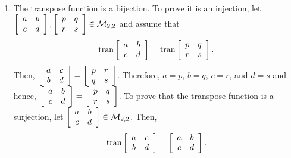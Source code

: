 \begin{enumerate}
\begin{enumerate}
\item The transpose function is a bijection.  To prove it is an injection, let 
$\left[ {\begin{array}{*{20}c}
   a & b  \\
   c & d  \\
\end{array} } \right], \left[ {\begin{array}{*{20}c}
   p & q  \\
   r & s  \\
\end{array} } \right] \in \mathcal{M}_{2, 2}$ and assume that
\[
\text{tran}\left[ {\begin{array}{*{20}c}
   a & b  \\
   c & d  \\
 \end{array} } \right] = \text{tran}\left[ {\begin{array}{*{20}c}
   p & q  \\
   r & s  \\
 \end{array} } \right].
\]
Then, $\left[ {\begin{array}{*{20}c}
   a & c  \\
   b & d  \\
\end{array} } \right] = \left[ {\begin{array}{*{20}c}
   p & r  \\
   q & s  \\
\end{array} } \right]$.  Therefore, $a = p$, $b = q$, $c = r$, and $d = s$ and hence, 
$\left[ {\begin{array}{*{20}c}
   a & b  \\
   c & d  \\
\end{array} } \right] = \left[ {\begin{array}{*{20}c}
   p & q  \\
   r & s  \\
\end{array} } \right]$.  To prove that the transpose function is a surjection, let 
$\left[ {\begin{array}{*{20}c}
   a & b  \\
   c & d  \\
\end{array} } \right] \in \mathcal{M}_{2, 2}$.  Then,
\[
\text{tran}\left[ {\begin{array}{*{20}c}
   a & c  \\
   b & d  \\
 \end{array} } \right] = \left[ {\begin{array}{*{20}c}
   a & b  \\
   c & d  \\
 \end{array} } \right].
\]


\end{enumerate}
\end{enumerate}

